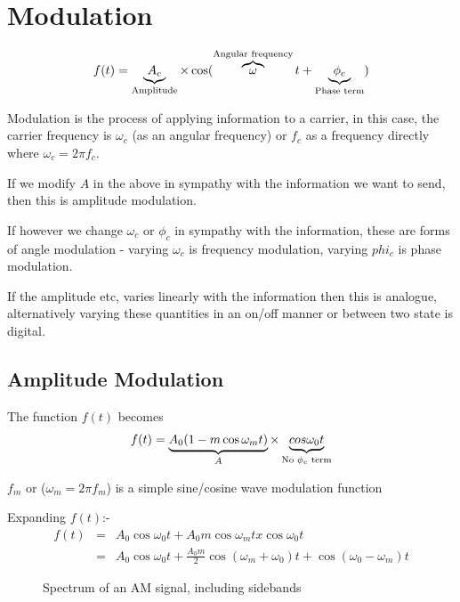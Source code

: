 \documentclass[11pt]{article} %
\begin{document}
\section{Modulation}
	\begin{equation}
		f(t) = \underbrace{A_c}_{\mbox{\scriptsize Amplitude}} \times \cos(\overbrace{\omega}^{\mbox{\scriptsize Angular frequency}} t + \underbrace{\phi _c}_{\mbox{\scriptsize Phase term}})
		\label{eq:radio}
	\end{equation}

	Modulation is the process of applying information to a carrier, in this case, the carrier frequency is $\omega _c$ (as an angular frequency) or $f_c$ as a frequency directly where $\omega_c = 2 \pi f_c$.

	If we modify $A$ in the above in sympathy with the information we want to send, then this is amplitude modulation.

	If however we change $\omega_c$ or $\phi _c$ in sympathy with the information, these are forms of angle modulation - varying $\omega _c$ is frequency modulation, varying $phi _c$ is phase modulation.

	If the amplitude etc, varies linearly with the information then this is analogue, alternatively varying these quantities in an on/off manner or between two state is digital.

	\subsection{Amplitude Modulation}
		The function $f(t)$ becomes
		\begin{equation}
			f(t)=\underbrace{A_0(1-m \cos \omega_m t)}_{A} \times \underbrace{cos \omega _0 t}_{\mbox{\scriptsize No $\phi _c$ term}}
			\label{eqn:am}
		\end{equation}

		$f_m$ or ($\omega_m = 2 \pi f_m$) is a simple sine/cosine wave modulation function

		Expanding $f(t)$:-
		\begin{eqnarray}
			f(t) &=& A_0 \cos \omega_0t + A_0m \cos\omega_mt x \cos \omega_0 t \nonumber \\
			&=& A_0 \cos\omega_0t+\frac{A_0m}{2} \cos(\omega_m+\omega_0)t+\cos(\omega_0-\omega_m)t
		\end{eqnarray}
		\begin{figure}[h]
			\centering
			\caption{Spectrum of an AM signal, including sidebands}
		\end{figure}
\end{document}
